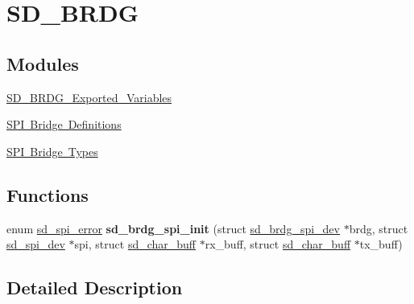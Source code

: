 \hypertarget{group___s_d___b_r_d_g}{}\section{S\+D\+\_\+\+B\+R\+DG}
\label{group___s_d___b_r_d_g}
\subsection*{Modules}
\begin{DoxyCompactItemize}
\item 
\mbox{\hyperlink{group___s_d___b_r_d_g___exported___variables}{S\+D\+\_\+\+B\+R\+D\+G\+\_\+\+Exported\+\_\+\+Variables}}
\item 
\mbox{\hyperlink{group___s_d___b_r_d_g___definitions}{S\+P\+I Bridge Definitions}}
\item 
\mbox{\hyperlink{group___s_d___b_r_d_g___types}{S\+P\+I Bridge Types}}
\end{DoxyCompactItemize}
\subsection*{Functions}
\begin{DoxyCompactItemize}
\item 
\mbox{\label{group___s_d___b_r_d_g_ga5ad084225dffdbc3e645e16beec6d387}} 
enum \mbox{\hyperlink{group___s_d___s_p_i___types_ga9ae67f7089a8196e9c6b74b8a6708c2e}{sd\+\_\+spi\+\_\+error}} {\bfseries sd\+\_\+brdg\+\_\+spi\+\_\+init} (struct \mbox{\hyperlink{structsd__brdg__spi__dev}{sd\+\_\+brdg\+\_\+spi\+\_\+dev}} $\ast$brdg, struct \mbox{\hyperlink{structsd__spi__dev}{sd\+\_\+spi\+\_\+dev}} $\ast$spi, struct \mbox{\hyperlink{structsd__char__buff}{sd\+\_\+char\+\_\+buff}} $\ast$rx\+\_\+buff, struct \mbox{\hyperlink{structsd__char__buff}{sd\+\_\+char\+\_\+buff}} $\ast$tx\+\_\+buff)
\end{DoxyCompactItemize}


\subsection{Detailed Description}

